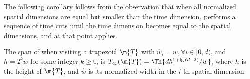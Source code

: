 The following corollary follows from the observation
that when all normalized spatial dimensions are equal but
smaller than the time dimension, 
performs a sequence of time cuts until the
time dimension becomes equal to the spatial dimensions,
and at that point 
applies.

\begin{corollary}
The span of  when visiting a trapezoid $\m{T}$ 
with ${\widehat{w}}_i = w, \forall{i} \in [0, d)$,
and $h = 2^k w$ for some integer $k \geq 0$,
is $T_{\infty}(\m{T}) = \Th{{ dh^{1 + \lg{(d + 2)}} / w}}$, where 
$h$ is the height of $\m{T}$, and
${\widehat{w}}$ is its normalized width in the $i$-th 
spatial dimension.
\label{cor:HyperspaceCutSimpleCase}
\end{corollary}



